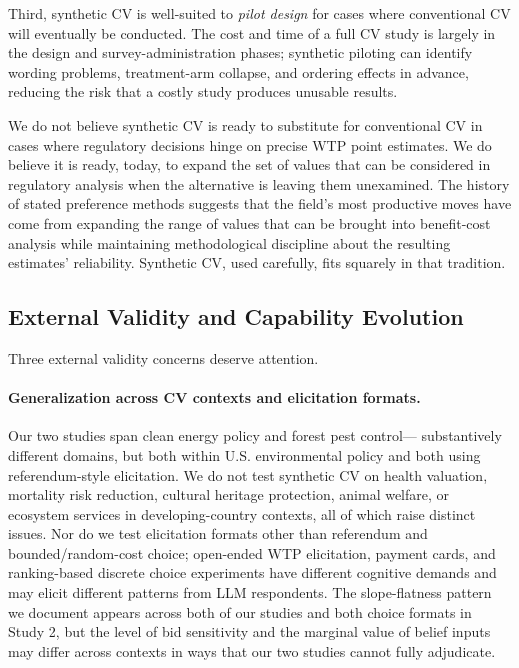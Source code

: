 \documentclass[12pt]{article}
\begin{document}
Third, synthetic CV is well-suited to \emph{pilot design} for cases
where conventional CV will eventually be conducted. The cost and time of
a full CV study is largely in the design and survey-administration
phases; synthetic piloting can identify wording problems, treatment-arm
collapse, and ordering effects in advance, reducing the risk that a
costly study produces unusable results.

We do not believe synthetic CV is ready to substitute for conventional
CV in cases where regulatory decisions hinge on precise WTP point
estimates. We do believe it is ready, today, to expand the set of
values that can be considered in regulatory analysis when the
alternative is leaving them unexamined. The history of stated preference
methods suggests that the field's most productive moves have come from
expanding the range of values that can be brought into benefit-cost
analysis while maintaining methodological discipline about the resulting
estimates' reliability. Synthetic CV, used carefully, fits squarely in
that tradition.

\subsection{External Validity and Capability Evolution}\label{sec:disc-external-validity}

Three external validity concerns deserve attention.

\paragraph{Generalization across CV contexts and elicitation formats.}
Our two studies span clean energy policy and forest pest control---
substantively different domains, but both within U.S. environmental
policy and both using referendum-style elicitation. We do not test
synthetic CV on health valuation, mortality risk reduction, cultural
heritage protection, animal welfare, or ecosystem services in
developing-country contexts, all of which raise distinct issues. Nor do
we test elicitation formats other than referendum and bounded/random-cost
choice; open-ended WTP elicitation, payment cards, and ranking-based
discrete choice experiments have different cognitive demands and may
elicit different patterns from LLM respondents. The slope-flatness
pattern we document appears across both of our studies and both choice
formats in Study 2, but the level of bid sensitivity and the marginal
value of belief inputs may differ across contexts in ways that our two
studies cannot fully adjudicate.
\end{document}
